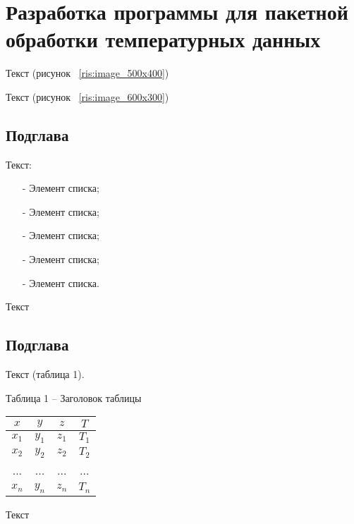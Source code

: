\newpage
\section{\Large Разработка программы для пакетной обработки температурных данных}
Текст (рисунок ~\ref{ris:image_500x400})
\\
\par
Текст (рисунок ~\ref{ris:image_600x300})
\\


\subsection{Подглава}
Текст:
\begin{itemize}
	\item[-] Элемент списка;
	\item[-] Элемент списка;
	\item[-] Элемент списка;
	\item[-] Элемент списка;
	\item[-] Элемент списка.
\end{itemize}
\par
Текст

\subsection{Подглава}
Текст (таблица 1).
\begin{table}[H]
	\begin{flushleft}\hspace{1.25cm}\Large Таблица 1 -- \label{tab:exp2values}Заголовок таблицы\end{flushleft}
	\begin{center}
		{\Large
			\begin{tabular}{|c|c|c|c|}
				\hline
				\hspace{1cm}$x$\hspace{1cm} & \hspace{1cm}$y$\hspace{1cm} & \hspace{1cm}$z$\hspace{1cm} & \hspace{1cm}$T$\hspace{1cm} \\
				\hline
				$x_1$ & $y_1$ & $z_1$ & $T_1$ \\
				\hline
				$x_2$ & $y_2$ & $z_2$ & $T_2$ \\
				\hline
				... & ... & ... & ... \\
				\hline
				$x_n$ & $y_n$ & $z_n$ & $T_n$ \\
				\hline
			\end{tabular}
		}
	\end{center}
\end{table}
\par
Текст

